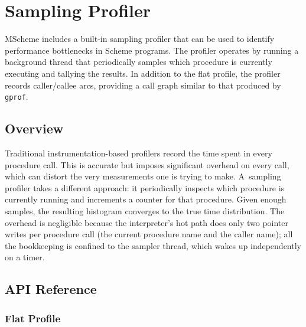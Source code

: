 \chapter{Sampling Profiler}\label{ch:profiler}

MScheme includes a built-in sampling profiler that can be used to
identify performance bottlenecks in Scheme programs.  The profiler
operates by running a background thread that periodically samples
which procedure is currently executing and tallying the results.
In addition to the flat profile, the profiler records caller/callee
arcs, providing a call graph similar to that produced by {\tt gprof}.

\section{Overview}

Traditional instrumentation-based profilers record the time spent in
every procedure call.  This is accurate but imposes significant
overhead on every call, which can distort the very measurements one is
trying to make.  A~sampling profiler takes a different approach: it
periodically inspects which procedure is currently running and
increments a counter for that procedure.  Given enough samples, the
resulting histogram converges to the true time distribution.  The
overhead is negligible because the interpreter's hot path does only
two pointer writes per procedure call (the current procedure name and
the caller name); all the bookkeeping is confined to the sampler
thread, which wakes up independently on a timer.

\section{API Reference}

\subsection{Flat Profile}

